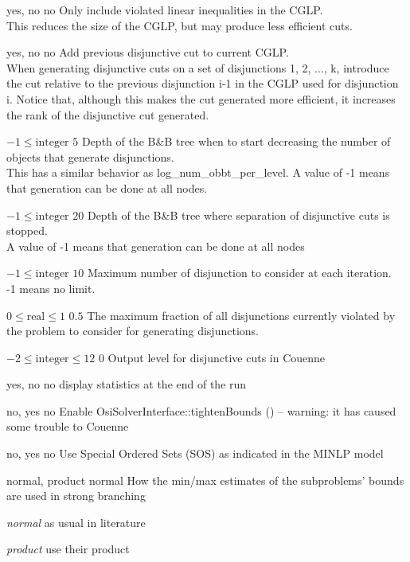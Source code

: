 %
{yes, no}%
{no}%
{Only include violated linear inequalities in the CGLP.\\
This reduces the size of the CGLP, but may produce less efficient cuts.}%
{}

%
{yes, no}%
{no}%
{Add previous disjunctive cut to current CGLP.\\
When generating disjunctive cuts on a set of disjunctions 1, 2, ..., k, introduce the cut relative to the previous disjunction i-1 in the CGLP used for disjunction i. Notice that, although this makes the cut generated more efficient, it increases the rank of the disjunctive cut generated.}%
{}

%
{$-1\leq\textrm{integer}$}%
{$5$}%
{Depth of the B\&B tree when to start decreasing the number of objects that generate disjunctions.\\
This has a similar behavior as log\_num\_obbt\_per\_level. A value of -1 means that generation can be done at all nodes.}%
{}

%
{$-1\leq\textrm{integer}$}%
{$20$}%
{Depth of the B\&B tree where separation of disjunctive cuts is stopped.\\
A value of -1 means that generation can be done at all nodes}%
{}

%
{$-1\leq\textrm{integer}$}%
{$10$}%
{Maximum number of disjunction to consider at each iteration.\\
-1 means no limit.}%
{}

%
{$0\leq\textrm{real}\leq1$}%
{$0.5$}%
{The maximum fraction of all disjunctions currently violated by the problem to consider for generating disjunctions.}%
{}

%
{$-2\leq\textrm{integer}\leq12$}%
{$0$}%
{Output level for disjunctive cuts in Couenne}%
{}

%
{yes, no}%
{no}%
{display statistics at the end of the run}%
{}

%
{no, yes}%
{no}%
{Enable OsiSolverInterface::tightenBounds () -- warning: it has caused some trouble to Couenne}%
{}

%
{no, yes}%
{no}%
{Use Special Ordered Sets (SOS) as indicated in the MINLP model}%
{}

%
{normal, product}%
{normal}%
{How the min/max estimates of the subproblems' bounds are used in strong branching}%
{\begin{list}{}{
\setlength{\parsep}{0em}
\setlength{\leftmargin}{3ex}
\setlength{\labelwidth}{1ex}
\setlength{\itemindent}{0ex}
\setlength{\topsep}{0pt}}
\item[\textit{normal}] as usual in literature
\item[\textit{product}] use their product
\end{list}
}

